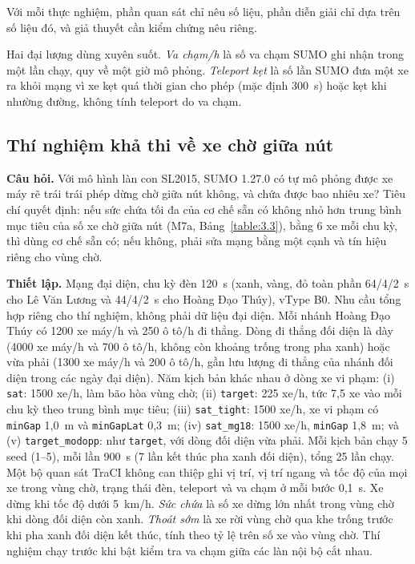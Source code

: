 \documentclass[../main.tex]{subfiles}
\begin{document}
Với mỗi thực nghiệm, phần quan sát chỉ nêu số liệu, phần diễn giải chỉ dựa trên số liệu đó, và giả thuyết cần kiểm chứng nêu riêng.

Hai đại lượng dùng xuyên suốt. \emph{Va chạm/h} là số va chạm SUMO ghi nhận trong một lần chạy, quy về một giờ mô phỏng. \emph{Teleport kẹt} là số lần SUMO đưa một xe ra khỏi mạng vì xe kẹt quá thời gian cho phép (mặc định 300~s) hoặc kẹt khi nhường đường, không tính teleport do va chạm.

\subsection{Thí nghiệm khả thi về xe chờ giữa nút}
\label{section:box_capacity}

\textbf{Câu hỏi.} Với mô hình làn con SL2015, SUMO 1.27.0 có tự mô phỏng được xe máy rẽ trái trái phép dừng chờ giữa nút không, và chứa được bao nhiêu xe? Tiêu chí quyết định: nếu sức chứa tối đa của cơ chế sẵn có không nhỏ hơn trung bình mục tiêu của số xe chờ giữa nút (M7a, Bảng~\ref{table:3.3}), bằng 6 xe mỗi chu kỳ, thì dùng cơ chế sẵn có; nếu không, phải sửa mạng bằng một cạnh và tín hiệu riêng cho vùng chờ.

\textbf{Thiết lập.} Mạng đại diện, chu kỳ đèn 120~s (xanh, vàng, đỏ toàn phần 64/4/2~s cho Lê Văn Lương và 44/4/2~s cho Hoàng Đạo Thúy), vType B0. Nhu cầu tổng hợp riêng cho thí nghiệm, không phải dữ liệu đại diện. Mỗi nhánh Hoàng Đạo Thúy có 1200 xe máy/h và 250 ô tô/h đi thẳng. Dòng đi thẳng đối diện là dày (4000 xe máy/h và 700 ô tô/h, không còn khoảng trống trong pha xanh) hoặc vừa phải (1300 xe máy/h và 200 ô tô/h, gần lưu lượng đi thẳng của nhánh đối diện trong các ngày đại diện). Năm kịch bản khác nhau ở dòng xe vi phạm: (i) \texttt{sat}: 1500 xe/h, làm bão hòa vùng chờ; (ii) \texttt{target}: 225 xe/h, tức 7,5 xe vào mỗi chu kỳ theo trung bình mục tiêu; (iii) \texttt{sat\_tight}: 1500 xe/h, xe vi phạm có \texttt{minGap} 1,0~m và \texttt{minGapLat} 0,3~m; (iv) \texttt{sat\_mg18}: 1500 xe/h, \texttt{minGap} 1,8~m; và (v) \texttt{target\_modopp}: như \texttt{target}, với dòng đối diện vừa phải.
Mỗi kịch bản chạy 5 seed (1--5), mỗi lần 900~s (7 lần kết thúc pha xanh đối diện), tổng 25 lần chạy. Một bộ quan sát TraCI không can thiệp ghi vị trí, vị trí ngang và tốc độ của mọi xe trong vùng chờ, trạng thái đèn, teleport và va chạm ở mỗi bước 0,1~s. Xe dừng khi tốc độ dưới 5~km/h. \emph{Sức chứa} là số xe dừng lớn nhất trong vùng chờ khi dòng đối diện còn xanh. \emph{Thoát sớm} là xe rời vùng chờ qua khe trống trước khi pha xanh đối diện kết thúc, tính theo tỷ lệ trên số xe vào vùng chờ. Thí nghiệm chạy trước khi bật kiểm tra va chạm giữa các làn nội bộ cắt nhau.
\end{document}
